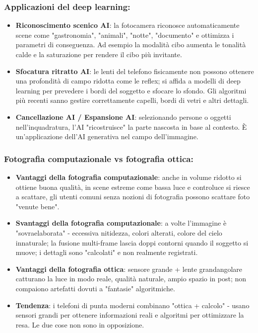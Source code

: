 \subsubsection*{Applicazioni del deep learning:}

\begin{itemize}
  \item \textbf{Riconoscimento scenico AI}: la fotocamera riconosce automaticamente scene come "gastronomia", "animali", "notte", "documento" e ottimizza i parametri di conseguenza. Ad esempio la modalità cibo aumenta le tonalità calde e la saturazione per rendere il cibo più invitante.
  \item \textbf{Sfocatura ritratto AI}: le lenti del telefono fisicamente non possono ottenere una profondità di campo ridotta come le reflex; si affida a modelli di deep learning per prevedere i bordi del soggetto e sfocare lo sfondo. Gli algoritmi più recenti sanno gestire correttamente capelli, bordi di vetri e altri dettagli.
  \item \textbf{Cancellazione AI / Espansione AI}: selezionando persone o oggetti nell'inquadratura, l'AI "ricostruisce" la parte nascosta in base al contesto. È un'applicazione dell'AI generativa nel campo dell'immagine.
\end{itemize}

\subsubsection*{Fotografia computazionale vs fotografia ottica:}

\begin{itemize}
  \item \textbf{Vantaggi della fotografia computazionale}: anche in volume ridotto si ottiene buona qualità, in scene estreme come bassa luce e controluce si riesce a scattare, gli utenti comuni senza nozioni di fotografia possono scattare foto "venute bene".
  \item \textbf{Svantaggi della fotografia computazionale}: a volte l'immagine è "sovraelaborata" - eccessiva nitidezza, colori alterati, colore del cielo innaturale; la fusione multi-frame lascia doppi contorni quando il soggetto si muove; i dettagli sono "calcolati" e non realmente registrati.
  \item \textbf{Vantaggi della fotografia ottica}: sensore grande + lente grandangolare catturano la luce in modo reale, qualità naturale, ampio spazio in post; non compaiono artefatti dovuti a "fantasie" algoritmiche.
  \item \textbf{Tendenza}: i telefoni di punta moderni combinano "ottica + calcolo" - usano sensori grandi per ottenere informazioni reali e algoritmi per ottimizzare la resa. Le due cose non sono in opposizione.
\end{itemize}

